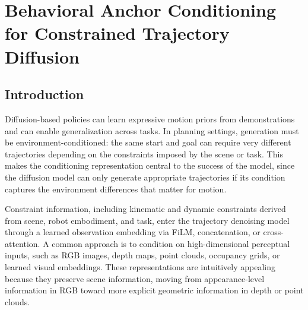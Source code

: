 
\chapter{Behavioral Anchor Conditioning for Constrained Trajectory Diffusion}
\label{ch:seeding}



\section{Introduction}\label{sec:introduction}

Diffusion-based policies can learn expressive motion priors from demonstrations and can enable generalization across tasks.
In planning settings, generation must be environment-conditioned: the same start and goal can require very different trajectories depending on the constraints imposed by the scene or task.
This makes the conditioning representation central to the success of the model, since the diffusion model can only generate appropriate trajectories if its condition captures the environment differences that matter for motion.

Constraint information, including kinematic and dynamic constraints derived from scene, robot embodiment, and task, enter the trajectory denoising model through a learned observation embedding via FiLM, concatenation, or cross-attention.
A common approach is to condition on high-dimensional perceptual inputs, such as RGB images, depth maps, point clouds, occupancy grids, or learned visual embeddings.
These representations are intuitively appealing because they preserve scene information, moving from appearance-level information in RGB toward more explicit geometric information in depth or point clouds.

